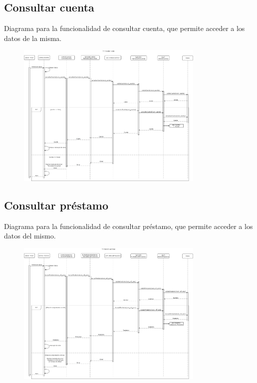 \documentclass[12pt]{article}
\begin{document}
\subsection{Consultar cuenta}
Diagrama para la funcionalidad de consultar cuenta, que permite acceder a los datos de la misma.
\begin{figure}[H]
    \centering
    \includegraphics[width=0.8\textwidth]{images/ConsultaCuenta.png}
\end{figure}
\subsection{Consultar préstamo}
Diagrama para la funcionalidad de consultar préstamo, que permite acceder a los datos del mismo.
\begin{figure}[H]
    \centering
    \includegraphics[width=0.8\textwidth]{images/consultar_prestamo.png}
\end{figure}
\end{document}
